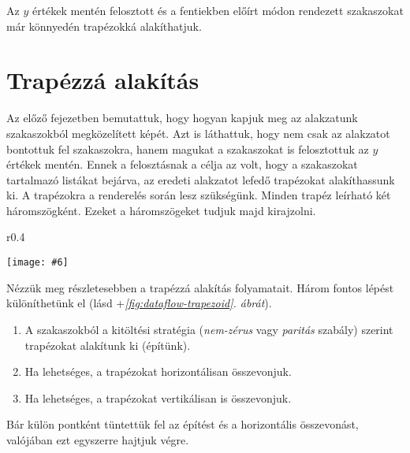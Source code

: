 \documentclass[12pt]{report}
\makeatletter
\theoremstyle{definition}
\newcommand{\melyikoldalra}{r}
\newlength{\Xoffset}
\newlength{\Yoffset}
\newcommand*{\setpdfoffset}[2]{%
  \setlength{\Xoffset}{#1}%
  \setlength{\Yoffset}{#2}%
}
\newcommand*{\setviewport}[4]{%
  \def\x@viewport{%
    {\the\dimexpr#1-\Xoffset}
    {\the\dimexpr#2-\Yoffset}
    {\the\dimexpr#3-\Xoffset}
    {\the\dimexpr#4-\Yoffset}%
  }%
}
\newcommand{\includegraphicskivagas}[6]{
    \setpdfoffset{0pt}{0pt}
    \setviewport{#1}{#2}{#3}{#4}
    \texttt{[image: \#6]}
}
\newcommand{\includedataflowkivagas}[5]{
    \includegraphicskivagas{#1}{#2}{#3}{#4}{scale=0.6,#5}
    {img/built/dataflow_eps}
}
\makeatother
\begin{document}
Az $y$ értékek mentén felosztott és a fentiekben előírt módon rendezett
szakaszokat már könnyedén trapézokká alakíthatjuk.

  \section{Trapézzá alakítás}

Az előző fejezetben bemutattuk, hogy hogyan kapjuk meg az alakzatunk
szakaszokból megközelített képét. Azt is láthattuk, hogy nem csak az alakzatot
bontottuk fel szakaszokra, hanem magukat a szakaszokat is felosztottuk az $y$
értékek mentén. Ennek a felosztásnak a célja az volt, hogy a szakaszokat
tartalmazó listákat bejárva, az eredeti alakzatot lefedő trapézokat
alakíthassunk ki. A trapézokra a renderelés során lesz szükségünk. Minden
trapéz leírható két háromszögként. Ezeket a háromszögeket tudjuk majd
kirajzolni.

  \begin{wrapfigure}{\melyikoldalra}{0.4\textwidth}
    \begin{center}
      \includedataflowkivagas{345pt}{200pt}{525pt}{393pt}{}
    \end{center}
    \caption{\label{fig:dataflow-trapezoid} A trapézzá alakítás és
    összevonás lépései \\ (Részlet \az+\emph{\ref{appendix:dataflow}.
    folyamatábrából}.)}
  \end{wrapfigure}

Nézzük meg részletesebben a trapézzá alakítás folyamatait. Három fontos lépést
különíthetünk el (lásd \az+\emph{\ref{fig:dataflow-trapezoid}. ábrát}).
  \begin{enumerate}
    \item A szakaszokból a kitöltési stratégia (\emph{nem-zérus} vagy
    \emph{paritás} szabály) szerint trapézokat alakítunk ki (építünk).
    \item Ha lehetséges, a trapézokat horizontálisan összevonjuk.
    \item Ha lehetséges, a trapézokat vertikálisan is összevonjuk.
  \end{enumerate}
Bár külön pontként tüntettük fel az építést és a horizontális összevonást,
valójában ezt egyszerre hajtjuk végre.
\end{document}
